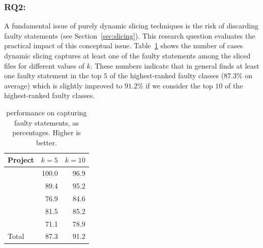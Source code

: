 \documentclass{article}
\begin{document}
\subsubsection{RQ2: \textit{\rqtwo}}
\label{rq:2}






A fundamental issue of purely dynamic slicing techniques is the risk
of discarding faulty statements (see Section~\ref{sec:slicing}). This
research question evaluates the practical impact of this conceptual
issue. Table~\ref{tab:ds-cases-captured} shows the number of cases
dynamic slicing captures at least one of the faulty statements among
the sliced files for different values of $k$. These numbers indicate
that in general \ds{} finds at least one faulty statement in the top
$5$ of the highest-ranked faulty classes ($87.3\%$ on average) which
is slightly improved to $91.2\%$ if we consider
the top $10$ of the highest-ranked faulty classes.



\begin{table}[h]
  \small
	\centering
	\setlength{\tabcolsep}{4pt}
	\begin{tabular}{lrr}
		\toprule
		Project             &  \multicolumn{1}{c}{$k=5$} & \multicolumn{1}{c}{$k=10$} \\ %
		\midrule

        \lang{}            & 100.0 & 96.9\\
        \cmath{}           & 89.4 & 95.2\\
		\chart{}			& 76.9 & 84.6 \\
        \jtime{}            & 81.5 & 85.2\\
        \mockito{}          & 71.1 & 78.9\\\midrule
        Total          & 87.3 & 91.2\\


		\bottomrule
	\end{tabular}
	\caption {\ds{} performance on capturing faulty statements, as
     percentages. Higher is better.}
   \label{tab:ds-cases-captured}
\vspace{-0.2cm}
   
\end{table}
\end{document}
